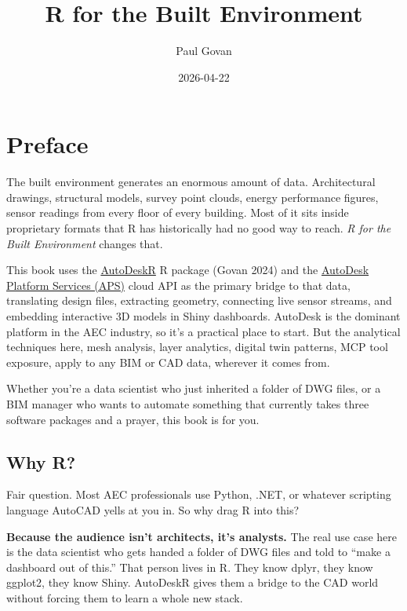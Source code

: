 \documentclass[
  11pt,
  letterpaper,
  DIV=11,
  numbers=noendperiod]{scrreprt}
\title{R for the Built Environment}
\author{Paul Govan}
\date{2026-04-22}
\renewcommand*\contentsname{Table of contents}
\newcommand\contentsname{Table of contents}
\begin{document}
\maketitle

\renewcommand*\contentsname{Table of contents}
{
\hypersetup{linkcolor=}
\setcounter{tocdepth}{2}
\tableofcontents
}


\chapter*{Preface}\label{preface}


The built environment generates an enormous amount of data.
Architectural drawings, structural models, survey point clouds, energy
performance figures, sensor readings from every floor of every building.
Most of it sits inside proprietary formats that R has historically had
no good way to reach. \emph{R for the Built Environment} changes that.

This book uses the
\href{https://github.com/paulgovan/AutoDeskR}{AutoDeskR} R package
(Govan 2024) and the \href{https://aps.autodesk.com}{AutoDesk Platform
Services (APS)} cloud API as the primary bridge to that data,
translating design files, extracting geometry, connecting live sensor
streams, and embedding interactive 3D models in Shiny dashboards.
AutoDesk is the dominant platform in the AEC industry, so it's a
practical place to start. But the analytical techniques here, mesh
analysis, layer analytics, digital twin patterns, MCP tool exposure,
apply to any BIM or CAD data, wherever it comes from.

Whether you're a data scientist who just inherited a folder of DWG
files, or a BIM manager who wants to automate something that currently
takes three software packages and a prayer, this book is for you.

\section*{Why R?}\label{why-r}


Fair question. Most AEC professionals use Python, .NET, or whatever
scripting language AutoCAD yells at you in. So why drag R into this?

\textbf{Because the audience isn't architects, it's analysts.} The real
use case here is the data scientist who gets handed a folder of DWG
files and told to ``make a dashboard out of this.'' That person lives in
R. They know dplyr, they know ggplot2, they know Shiny. AutoDeskR gives
them a bridge to the CAD world without forcing them to learn a whole new
stack.
\end{document}
